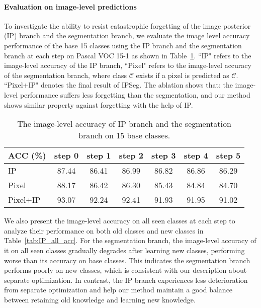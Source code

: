 \paragraph{Evaluation on image-level predictions} To investigate the ability to resist catastrophic forgetting of the image posterior (IP) branch and the segmentation branch, we evaluate the image level accuracy performance of the base 15 classes using the IP branch and the segmentation branch at each step on Pascal VOC 15-1 as shown in Table~\ref{tab:IP_base_acc}. ``IP" refers to the image-level accuracy of the IP branch, ``Pixel" refers to the image-level accuracy of the segmentation branch, where class $\mathcal{C}$ exists if a pixel is predicted as $\mathcal{C}$. ``Pixel+IP" denotes the final result of IPSeg. The ablation shows that: the image-level performance suffers less forgetting than the segmentation, and our method shows similar property against forgetting with the help of IP.

\begin{table}[h]
    \centering
    \caption{The image-level accuracy of IP branch and the segmentation branch on 15 base classes.}
    \begin{tabular}{l|c c c c c c}
         \toprule
         ACC (\%) & step 0 & step 1  & step 2 & step 3 & step 4 & step 5 \\
         \midrule
         IP & 87.44 & 86.41 & 86.99 & 86.82 & 86.86 & 86.29 \\
         Pixel & 88.17 & 86.42 & 86.30 & 85.43 & 84.84 & 84.70 \\
         Pixel+IP & 93.07 & 92.24 & 92.41 & 91.93 & 91.95 & 91.02 \\
         \bottomrule
    \end{tabular}
    \label{tab:IP_base_acc}
\end{table}

We also present the image-level accuracy on all seen classes at each step to analyze their performance on both old classes and new classes in Table~\ref{tab:IP_all_acc}. For the segmentation branch, the image-level accuracy of it on all seen classes gradually degrades after learning new classes, performing worse than its accuracy on base classes. This indicates the segmentation branch performs poorly on new classes, which is consistent with our description about separate optimization. In contrast, the IP branch experiences less deterioration from separate optimization and help our method maintain a good balance between retaining old knowledge and learning new knowledge. 

